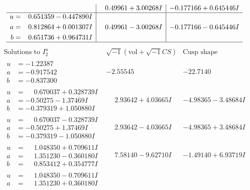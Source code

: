 \documentclass[1p]{elsarticle_modified}
\theoremstyle{definition}
\newcommand{\I}{\sqrt{-1}}
\begin{document}
$$\begin{array}{c|c|c}
 & \phantom{-}0.49961 + 3.00268 I & -0.177166 + 0.645446 I \\ \hline\begin{aligned}
u &= \phantom{-}0.651359 - 0.447890 I \\
a &= \phantom{-}0.812864 + 0.001307 I \\
b &= \phantom{-}0.651736 + 0.964731 I\end{aligned}
 & \phantom{-}0.49961 - 3.00268 I & -0.177166 - 0.645446 I\\
 \hline 
 \end{array}$$\newpage$$\begin{array}{c|c|c}  
\text{Solutions to }I^u_{2}& \I (\text{vol} + \sqrt{-1}CS) & \text{Cusp shape}\\
 \hline 
\begin{aligned}
u &= -1.22387\phantom{ +0.000000I} \\
a &= -0.917542\phantom{ +0.000000I} \\
b &= -0.837300\phantom{ +0.000000I}\end{aligned}
 & -2.55545\phantom{ +0.000000I} & -22.7140\phantom{ +0.000000I} \\ \hline\begin{aligned}
u &= \phantom{-}0.670037 + 0.328739 I \\
a &= -0.50275 - 1.37469 I \\
b &= -0.379319 + 1.050880 I\end{aligned}
 & \phantom{-}2.93642 + 4.03665 I & -4.98365 - 3.48684 I \\ \hline\begin{aligned}
u &= \phantom{-}0.670037 - 0.328739 I \\
a &= -0.50275 + 1.37469 I \\
b &= -0.379319 - 1.050880 I\end{aligned}
 & \phantom{-}2.93642 - 4.03665 I & -4.98365 + 3.48684 I \\ \hline\begin{aligned}
u &= \phantom{-}1.048350 + 0.709611 I \\
a &= \phantom{-}1.351230 - 0.360180 I \\
b &= \phantom{-}0.853412 + 0.354777 I\end{aligned}
 & \phantom{-}7.58140 - 9.62710 I & -1.49140 + 6.93719 I \\ \hline\begin{aligned}
u &= \phantom{-}1.048350 - 0.709611 I \\
a &= \phantom{-}1.351230 + 0.360180 I \\

\end{aligned}
\end{array}$$
\end{document}
